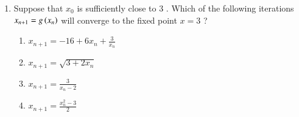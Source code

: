 \documentclass[journal]{IEEEtran}
\begin{document}
\begin{enumerate}
\begin{enumerate}
	       \end{enumerate}
        \item Suppose that $x_{0}$ is sufficiently close to $3$ . Which of the following iterations $x_{n+1}=g\left(x_{n}\right)$ will converge to the fixed point $x=3$ ?
            \begin{enumerate}
			\item $x_{n+1}=-16+6 x_{n}+\frac{3}{x_{n}}$
			\item $x_{n+1}=\sqrt{3+2 x_{n}}$
			\item $x_{n+1}=\frac{3}{x_{n}-2}$
			\item $x_{n+1}=\frac{x_{n}^{2}-3}{2}$
        	\end{enumerate}	
\end{enumerate}		
\end{document}
